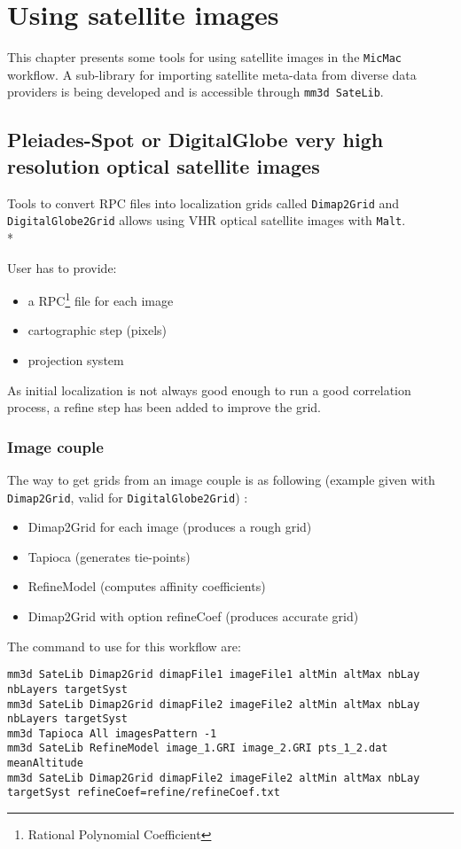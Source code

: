 \chapter{Using satellite images}

This chapter presents some tools for using satellite images in the {\tt MicMac} workflow. A sub-library for importing satellite meta-data from diverse data providers is being developed and is accessible through {\tt mm3d SateLib}.

\section{Pleiades-Spot or DigitalGlobe very high resolution optical satellite images}

Tools to convert RPC files into localization grids called {\tt Dimap2Grid} and {\tt DigitalGlobe2Grid} allows using VHR optical satellite images with {\tt Malt}.\\*

User has to provide:
\begin{itemize}
\item a RPC\footnote{Rational Polynomial Coefficient} file for each image
\item cartographic step (pixels)
\item projection system
\end{itemize}

As initial localization is not always good enough to run a good correlation process, a refine step has been added to improve the grid.

\subsection{Image couple}

The way to get grids from an image couple is as following (example given with {\tt Dimap2Grid}, valid for {\tt DigitalGlobe2Grid}) :

\begin{itemize}
\item Dimap2Grid for each image (produces a rough grid)
\item Tapioca (generates tie-points)
\item RefineModel (computes affinity coefficients)
\item Dimap2Grid with option refineCoef (produces accurate grid)
\end{itemize}

The command to use for this workflow are:
\begin{verbatim}
mm3d SateLib Dimap2Grid dimapFile1 imageFile1 altMin altMax nbLay  nbLayers targetSyst
mm3d SateLib Dimap2Grid dimapFile2 imageFile2 altMin altMax nbLay  nbLayers targetSyst
mm3d Tapioca All imagesPattern -1
mm3d SateLib RefineModel image_1.GRI image_2.GRI pts_1_2.dat meanAltitude
mm3d SateLib Dimap2Grid dimapFile2 imageFile2 altMin altMax nbLay targetSyst refineCoef=refine/refineCoef.txt
\end{verbatim}

